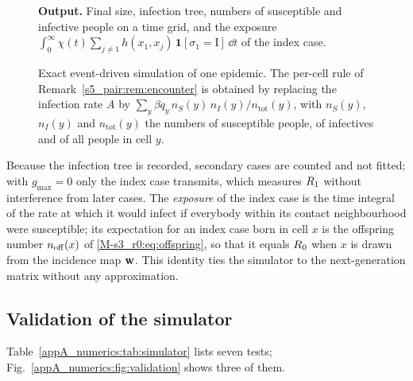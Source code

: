 \begin{figure}[tbp]
{\begin{minipage}{0.94\textwidth}
\textbf{Output.} Final size, infection tree, numbers of susceptible and infective people on a time grid, and
the exposure $\int_0^{\infty}\chi(t)\sum_{j\ne1}h(x_1,x_j)\,\mathbf{1}[\sigma_1=\mathrm{I}]\,\dd t$ of the index case.
\end{minipage}}
\caption{Exact event-driven simulation of one epidemic. The per-cell rule of Remark~\ref{s5_pair:rem:encounter} is obtained by
replacing the infection rate $A$ by $\sum_y\beta q_y\,n_S(y)\,n_I(y)/n_{\mathrm{tot}}(y)$, with $n_S(y)$,
$n_I(y)$ and $n_{\mathrm{tot}}(y)$ the numbers of susceptible people, of infectives and of all people in cell
$y$.}
\label{appA_numerics:fig:algorithm}
\end{figure}

Because the infection tree is recorded, secondary cases are counted and not fitted; with $g_{\max}=0$ only the
index case transmits, which measures $R_1$ without interference from later cases. The \emph{exposure} of the
index case is the time integral of the rate at which it would infect if everybody within its contact
neighbourhood were susceptible; its expectation for an index case born in cell $x$ is the offspring number
$n_{\mathrm{off}}(x)$ of \eqref{M-s3_r0:eq:offspring}, so that it equals $R_0$ when $x$ is drawn from the incidence map
$\mathbf{w}$. This identity ties the simulator to the next-generation matrix without any approximation.

\subsection{Validation of the simulator}\label{appA_numerics:sec:validation}

Table~\ref{appA_numerics:tab:simulator} lists seven tests; Fig.~\ref{appA_numerics:fig:validation} shows
three of them.


